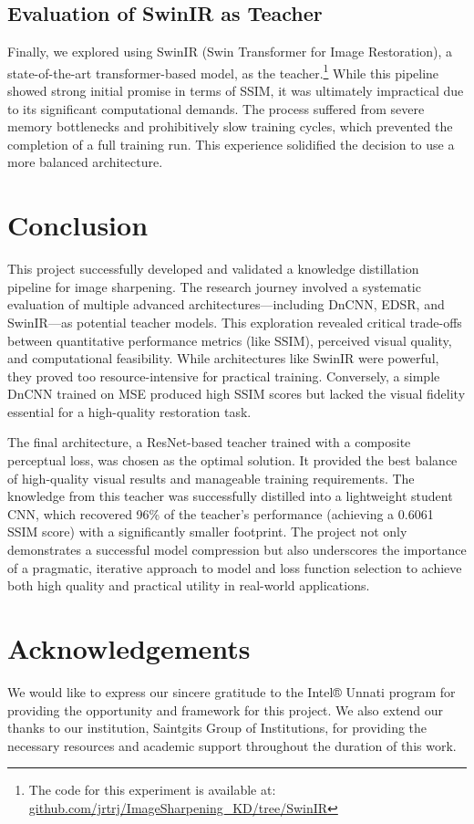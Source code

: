 \documentclass[12pt,a4paper]{article}
\begin{document}
\subsection{Evaluation of SwinIR as Teacher}
Finally, we explored using SwinIR (Swin Transformer for Image Restoration), a state-of-the-art transformer-based model, as the teacher.\footnote{The code for this experiment is available at: \href{https://github.com/jrtrj/ImageSharpening_KD/tree/SwinIR}{github.com/jrtrj/ImageSharpening\_KD/tree/SwinIR}} While this pipeline showed strong initial promise in terms of SSIM, it was ultimately impractical due to its significant computational demands. The process suffered from severe memory bottlenecks and prohibitively slow training cycles, which prevented the completion of a full training run. This experience solidified the decision to use a more balanced architecture.

\newpage
\section{Conclusion}
This project successfully developed and validated a knowledge distillation pipeline for image sharpening. The research journey involved a systematic evaluation of multiple advanced architectures—including DnCNN, EDSR, and SwinIR—as potential teacher models. This exploration revealed critical trade-offs between quantitative performance metrics (like SSIM), perceived visual quality, and computational feasibility. While architectures like SwinIR were powerful, they proved too resource-intensive for practical training. Conversely, a simple DnCNN trained on MSE produced high SSIM scores but lacked the visual fidelity essential for a high-quality restoration task.

The final architecture, a ResNet-based teacher trained with a composite perceptual loss, was chosen as the optimal solution. It provided the best balance of high-quality visual results and manageable training requirements. The knowledge from this teacher was successfully distilled into a lightweight student CNN, which recovered 96\% of the teacher’s performance (achieving a 0.6061 SSIM score) with a significantly smaller footprint. The project not only demonstrates a successful model compression but also underscores the importance of a pragmatic, iterative approach to model and loss function selection to achieve both high quality and practical utility in real-world applications.

\newpage
\section*{Acknowledgements}
We would like to express our sincere gratitude to the Intel® Unnati program for providing the opportunity and framework for this project. We also extend our thanks to our institution, Saintgits Group of Institutions, for providing the necessary resources and academic support throughout the duration of this work.
\end{document}
